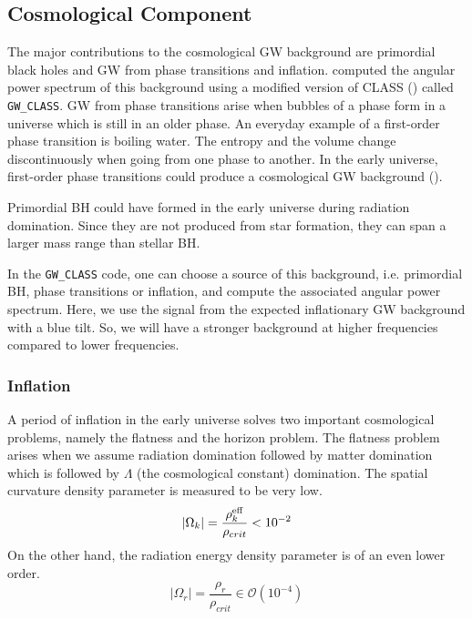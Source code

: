 \subsection{Cosmological Component}
\label{cosmo_bg}
The major contributions to the cosmological GW background are primordial
black holes and GW from phase transitions and inflation. \cite{schulze_gw_class_2023} computed the angular power spectrum of this background using a modified version of CLASS (\cite{blas_cosmic_2011}) called {\tt GW\_CLASS}.
GW from phase transitions arise when bubbles of a phase form in a universe which is still in an older phase. An everyday example of a first-order phase transition is boiling water. The entropy and the volume change discontinuously when going from one phase to another. In the early universe, first-order phase transitions could produce a cosmological GW background (\cite{christensen_stochastic_2019}). 

Primordial BH could have formed in the early universe during radiation domination. Since they are not produced from star formation, they can span a larger mass range than stellar BH. 


In the {\tt GW\_CLASS} code, one can choose a source of this background, i.e. primordial BH, phase transitions or inflation, and compute the associated angular power spectrum. Here, we use the signal from the expected inflationary GW background with a blue tilt. So, we will have a stronger background at higher frequencies compared to lower frequencies. 

\subsubsection{Inflation}

A period of inflation in the early universe solves two important cosmological problems, namely the flatness and the horizon problem. The flatness problem arises when we assume radiation domination followed by matter domination which is followed by $\Lambda$ (the cosmological constant) domination. The spatial curvature density parameter is measured to be very low. 
\begin{equation}
    |\Omega_k| = \frac{\rho_k^{\rm{eff}}}{\rho_{crit}} < 10^{-2}
\end{equation} 
On the other hand, the radiation energy density parameter is of an even lower order.
\begin{equation}
    |\Omega_r| = \frac{\rho_r}{\rho_{crit}} \in \mathcal{O}(10^{-4}) 
\end{equation}

